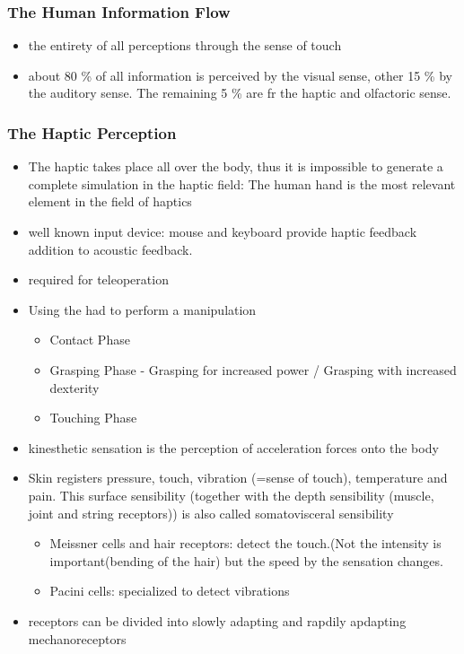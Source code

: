 \documentclass{standalone}
\begin{document}
\subsubsection{The Human Information Flow}
\begin{itemize}
	\item the entirety of all perceptions through the sense of touch
	\item about 80 \% of all information is perceived by the visual sense, other 15 \% by the auditory sense. The remaining 5 \% are fr the haptic and olfactoric sense. 
\end{itemize}
\subsubsection{The Haptic Perception}
\begin{itemize}
	\item The haptic takes place all over the body, thus it is impossible to generate a complete simulation in the haptic field: The human hand is the most relevant element in the field of haptics
	\item well known input device: mouse and keyboard provide haptic feedback addition to acoustic feedback.
	\item required for teleoperation
	\item Using the had to perform a manipulation
	\begin{itemize}
		\item Contact Phase
		\item Grasping Phase
		- Grasping for increased power / Grasping with increased dexterity
		\item Touching Phase
	\end{itemize}
	\item kinesthetic sensation is the perception of acceleration forces onto the body
	\item Skin registers pressure, touch, vibration (=sense of touch), temperature and pain. This surface sensibility (together with the depth sensibility (muscle, joint and string receptors)) is also called somatovisceral sensibility
	\begin{itemize}
		\item Meissner cells and hair receptors: detect the touch.(Not the intensity is important(bending of the hair) but the speed by the sensation changes.
		\item Pacini cells: specialized to detect vibrations
	\end{itemize}
	\item receptors can be divided into slowly adapting and rapdily apdapting mechanoreceptors

\end{itemize}
\end{document}
